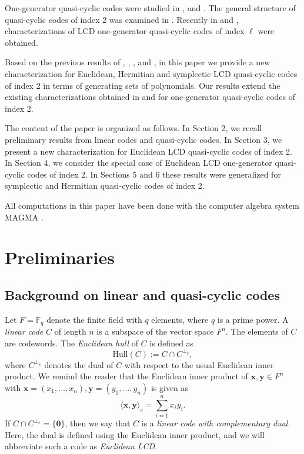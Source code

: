 \documentclass[a4paper,12pt]{article}
\begin{document}
One-generator quasi-cyclic codes were studied in \cite{quasi1},  \cite{seguin2004} and \cite{seguin1990}.  The general structure of quasi-cyclic codes of index 2 was examined in \cite{quasi2}.
  Recently in \cite{guneri2023} and \cite{guan2023}, characterizations of  LCD one-generator quasi-cyclic codes of index $\ell$  were obtained. 

  
 Based on the previous results of  \cite{quasi2}, \cite{guneri2016}, \cite{lally2001}, and \cite{ling2001}, in this paper we provide a new characterization  for Euclidean, Hermitian and symplectic LCD quasi-cyclic codes of index 2 in terms of  generating sets of polynomials. 
 Our results extend
the existing characterizations obtained in \cite{guneri2023} and \cite{guan2023} for one-generator quasi-cyclic codes of index 2. 
 

 The content of the paper is organized as follows.  In Section 2, we recall preliminary results from linear codes and quasi-cyclic codes. In Section 3, we present a new characterization for Euclidean LCD quasi-cyclic codes of index 2. In Section 4, we consider the special case of Euclidean LCD one-generator quasi-cyclic codes of index 2.   
In Sections 5 and 6 these results were generalized for symplectic and Hermitian   quasi-cyclic codes of index 2. 

 All computations in this paper have been done with the computer algebra system MAGMA \cite{magma}.

\section{Preliminaries}

 

\subsection{Background on linear and quasi-cyclic codes}
 Let $F=\mathbb{F}_q$ denote the finite field with $q$ elements, where $q$ is a prime power.
 A \textit{linear code} $C$ of length $n$ is a subspace of the vector  space $F^n$.  The elements of $C$ are codewords. The \textit{Euclidean hull} of $C$ is defined as
 \[
\text{Hull}(C):= C \cap C^{\perp_e},
 \]
where $C^{\perp_e}$ denotes the dual of $C$ with respect to the usual Euclidean inner product. We remind the reader that the Euclidean inner product of $\mathbf{x},\mathbf{y} \in F^n$ with  $\mathbf{x} = (x_1, \dots, x_n), \mathbf{y} = (y_1, \dots, y_n)$ is given as
\[
\langle \mathbf{x}, \mathbf{y} \rangle_e = \sum_{i=1}^n x_i y_i.
\]
If $C \cap C^{\perp_e} =\{ \mathbf{0}\}$, then we say that $C$ is a \textit{linear code with complementary dual}. Here, the dual is defined using the Euclidean inner product, and we will abbreviate such a code as \textit{Euclidean LCD}.
\end{document}
